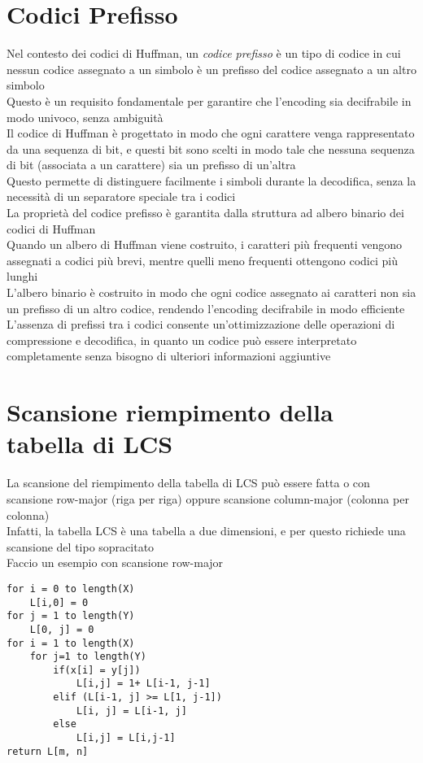 \documentclass[12pt,oneside,a4paper]{article}
\begin{document}
\section{Codici Prefisso}
Nel contesto dei codici di Huffman, un \textit{codice prefisso} è un tipo di codice in cui nessun codice assegnato a un simbolo è un prefisso del codice assegnato a un altro simbolo\\
Questo è un requisito fondamentale per garantire che l'encoding sia decifrabile in modo univoco, senza ambiguità\\
Il codice di Huffman è progettato in modo che ogni carattere venga rappresentato da una sequenza di bit, e questi bit sono scelti in modo tale che nessuna sequenza di bit (associata a un carattere) sia un prefisso di un'altra\\
Questo permette di distinguere facilmente i simboli durante la decodifica, senza la necessità di un separatore speciale tra i codici\\
La proprietà del codice prefisso è garantita dalla struttura ad albero binario dei codici di Huffman\\
Quando un albero di Huffman viene costruito, i caratteri più frequenti vengono assegnati a codici più brevi, mentre quelli meno frequenti ottengono codici più lunghi\\
L'albero binario è costruito in modo che ogni codice assegnato ai caratteri non sia un prefisso di un altro codice, rendendo l'encoding decifrabile in modo efficiente\\
L'assenza di prefissi tra i codici consente un'ottimizzazione delle operazioni di compressione e decodifica, in quanto un codice può essere interpretato completamente senza bisogno di ulteriori informazioni aggiuntive
\section{Scansione riempimento della tabella di LCS}
La scansione del riempimento della tabella di LCS può essere fatta o con scansione row-major (riga per riga) oppure scansione column-major (colonna per colonna)\\
Infatti, la tabella LCS è una tabella a due dimensioni, e per questo richiede una scansione del tipo sopracitato\\
Faccio un esempio con scansione row-major
\newpage
\begin{lstlisting}[style=pseudocodice]
for i = 0 to length(X)
	L[i,0] = 0
for j = 1 to length(Y)
	L[0, j] = 0
for i = 1 to length(X)
	for j=1 to length(Y)
		if(x[i] = y[j])
			L[i,j] = 1+ L[i-1, j-1]
		elif (L[i-1, j] >= L[1, j-1])
			L[i, j] = L[i-1, j]
		else
			L[i,j] = L[i,j-1]
return L[m, n]
\end{lstlisting}
\end{document}
